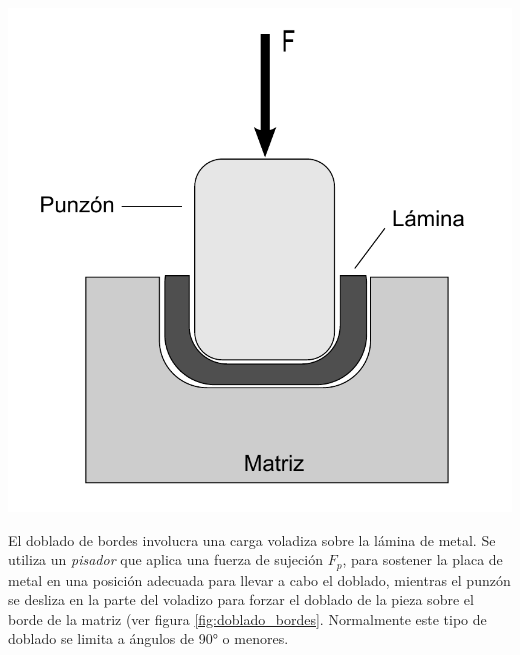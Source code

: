 \begin{center}
\includegraphics[scale=0.4]{src/ch2/doblado_u}
\label{fig:doblado_u}
\end{center}

El doblado de bordes involucra una carga voladiza sobre la lámina de metal. Se utiliza 
un \textit{pisador} que aplica una fuerza de sujeción $F_p$, para sostener la placa de 
metal en una posición adecuada para llevar a cabo el doblado, mientras el punzón 
se desliza en la parte del voladizo para forzar el doblado de la pieza sobre el borde 
de la matriz (ver figura \ref{fig:doblado_bordes}. Normalmente este tipo de doblado 
se limita a ángulos de 90° o menores.

